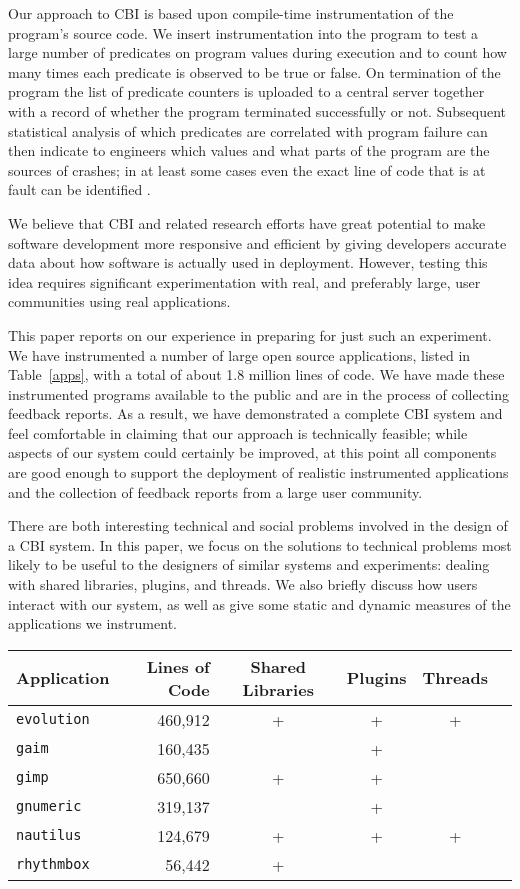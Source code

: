 \documentclass[times,10pt,twocolumn]{article}
\newcommand{\evolution}{\tt evolution}
\newcommand{\gaim}{\tt gaim}
\newcommand{\gimp}{\tt gimp}
\newcommand{\gnumeric}{\tt gnumeric}
\newcommand{\nautilus}{\tt nautilus}
\newcommand{\rhythmbox}{\tt rhythmbox}
\begin{document}
Our approach to CBI is based upon compile-time instrumentation of the
program's source code.  We insert instrumentation into the program to
test a large number of predicates on program values during
execution and to count how many times each predicate is observed to be
true or false.  On termination of the program the list of predicate
counters is uploaded to a central server together with a record of
whether the program terminated successfully or not.  Subsequent
statistical analysis of which predicates are correlated with program
failure can then indicate to engineers which values and what parts of
the program are the sources of crashes; in at least some cases even
the exact line of code that is at fault can be identified \cite{PLDI`03*141,Liblit:2003:SUEBI,Zheng:2003:SDSP}.

We believe that CBI and related research efforts have great potential
to make software development more responsive and efficient by giving
developers accurate data about how software is actually used in
deployment.  However, testing this idea requires significant
experimentation with real, and preferably large, user communities
using real applications.

This paper reports on our experience in preparing for just such an
experiment.  We have instrumented a number of large open source
applications, listed in Table~\ref{apps}, with a total of about 1.8
million lines of code. We have made these instrumented programs
available to the public and are in the process of collecting feedback
reports.  As a result, we have demonstrated a complete CBI system and
feel comfortable in claiming that our approach is technically
feasible; while aspects of our system could certainly be improved, at
this point all components are good enough to support the deployment of
realistic instrumented applications and the collection of feedback
reports from a large user community.

There are both interesting technical and social problems involved in
the design of a CBI system.  In this paper, we focus on the solutions
to technical problems most likely to be useful to the designers of
similar systems and experiments: dealing with shared libraries,
plugins, and threads.  We also briefly discuss how users interact with
our system, as well as give some static and dynamic measures of the
applications we instrument.

\begin{table*}
  \centering
  \begin{tabular}{lrcccc}
    Application & Lines of Code & Shared Libraries & Plugins & Threads \\\hline
    \evolution & 460,912 & + & + & + \\
    \gaim & 160,435 & & + & \\
    \gimp & 650,660 & + & + & \\
    \gnumeric & 319,137 & & + & \\
    \nautilus & 124,679 & + & + & + \\
    \rhythmbox & 56,442 & + & &
  \end{tabular}
  \caption{Instrumented applications.}
  \label{apps}
\end{table*}
\end{document}
